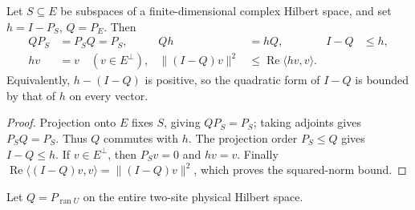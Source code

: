 \begin{lemma}
    \label{thm:mpo_supported_parent_projection}
    \leanok
    Let $S\subseteq E$ be subspaces of a finite-dimensional complex
    Hilbert space, and set $h=I-P_S$, $Q=P_E$. Then
    \begin{align}
        QP_S & =P_SQ=P_S,             & Qh                                       & =hQ, & I-Q & \le h, \\
        hv   & =v\quad(v\in E^\perp),
             & \|(I-Q)v\|^2           & \le\operatorname{Re}\langle hv,v\rangle.
    \end{align}
    Equivalently, $h-(I-Q)$ is positive, so the quadratic form of
    $I-Q$ is bounded by that of $h$ on every vector.
\end{lemma}
\begin{proof}
    \leanok
    Projection onto $E$ fixes $S$, giving $QP_S=P_S$; taking
    adjoints gives $P_SQ=P_S$. Thus $Q$ commutes with $h$.
    The projection order $P_S\le Q$ gives $I-Q\le h$.
    If $v\in E^\perp$, then $P_Sv=0$ and $hv=v$.
    Finally $\operatorname{Re}\langle(I-Q)v,v\rangle
        =\|(I-Q)v\|^2$, which proves the squared-norm bound.
\end{proof}

\begin{definition}
    \label{def:mpo_joint_full_frame_projection}
    \leanok
    Let $Q=P_{\operatorname{ran}U}$ on the entire two-site physical
    Hilbert space.
\end{definition}

